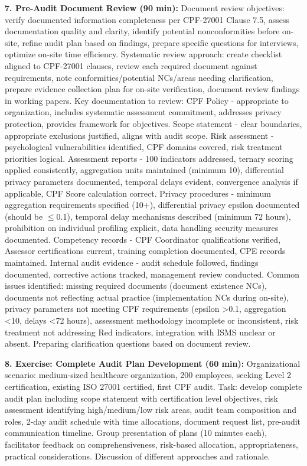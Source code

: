 \documentclass[11pt,a4paper]{article}
\begin{document}
\textbf{7. Pre-Audit Document Review (90 min):} Document review objectives: verify documented information completeness per CPF-27001 Clause 7.5, assess documentation quality and clarity, identify potential nonconformities before on-site, refine audit plan based on findings, prepare specific questions for interviews, optimize on-site time efficiency. Systematic review approach: create checklist aligned to CPF-27001 clauses, review each required document against requirements, note conformities/potential NCs/areas needing clarification, prepare evidence collection plan for on-site verification, document review findings in working papers. Key documentation to review: CPF Policy - appropriate to organization, includes systematic assessment commitment, addresses privacy protection, provides framework for objectives. Scope statement - clear boundaries, appropriate exclusions justified, aligns with audit scope. Risk assessment - psychological vulnerabilities identified, CPF domains covered, risk treatment priorities logical. Assessment reports - 100 indicators addressed, ternary scoring applied consistently, aggregation units maintained (minimum 10), differential privacy parameters documented, temporal delays evident, convergence analysis if applicable, CPF Score calculation correct. Privacy procedures - minimum aggregation requirements specified (10+), differential privacy epsilon documented (should be $\leq$0.1), temporal delay mechanisms described (minimum 72 hours), prohibition on individual profiling explicit, data handling security measures documented. Competency records - CPF Coordinator qualifications verified, Assessor certifications current, training completion documented, CPE records maintained. Internal audit evidence - audit schedule followed, findings documented, corrective actions tracked, management review conducted. Common issues identified: missing required documents (document existence NCs), documents not reflecting actual practice (implementation NCs during on-site), privacy parameters not meeting CPF requirements (epsilon >0.1, aggregation <10, delays <72 hours), assessment methodology incomplete or inconsistent, risk treatment not addressing Red indicators, integration with ISMS unclear or absent. Preparing clarification questions based on document review.

\textbf{8. Exercise: Complete Audit Plan Development (60 min):} Organizational scenario: medium-sized healthcare organization, 200 employees, seeking Level 2 certification, existing ISO 27001 certified, first CPF audit. Task: develop complete audit plan including scope statement with certification level objectives, risk assessment identifying high/medium/low risk areas, audit team composition and roles, 2-day audit schedule with time allocations, document request list, pre-audit communication timeline. Group presentation of plans (10 minutes each), facilitator feedback on comprehensiveness, risk-based allocation, appropriateness, practical considerations. Discussion of different approaches and rationale.
\end{document}
